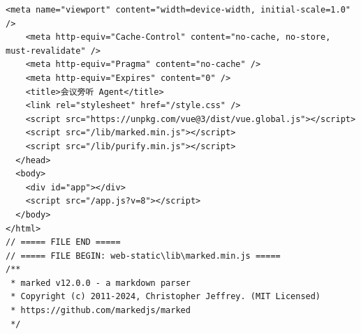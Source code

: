 \documentclass[12pt,a4paper]{article}
\begin{document}
\begin{Verbatim}[fontsize=\footnotesize]
    <meta name="viewport" content="width=device-width, initial-scale=1.0" />
    <meta http-equiv="Cache-Control" content="no-cache, no-store, must-revalidate" />
    <meta http-equiv="Pragma" content="no-cache" />
    <meta http-equiv="Expires" content="0" />
    <title>会议旁听 Agent</title>
    <link rel="stylesheet" href="/style.css" />
    <script src="https://unpkg.com/vue@3/dist/vue.global.js"></script>
    <script src="/lib/marked.min.js"></script>
    <script src="/lib/purify.min.js"></script>
  </head>
  <body>
    <div id="app"></div>
    <script src="/app.js?v=8"></script>
  </body>
</html>
// ===== FILE END =====
// ===== FILE BEGIN: web-static\lib\marked.min.js =====
/**
 * marked v12.0.0 - a markdown parser
 * Copyright (c) 2011-2024, Christopher Jeffrey. (MIT Licensed)
 * https://github.com/markedjs/marked
 */

\end{Verbatim}
\end{document}
